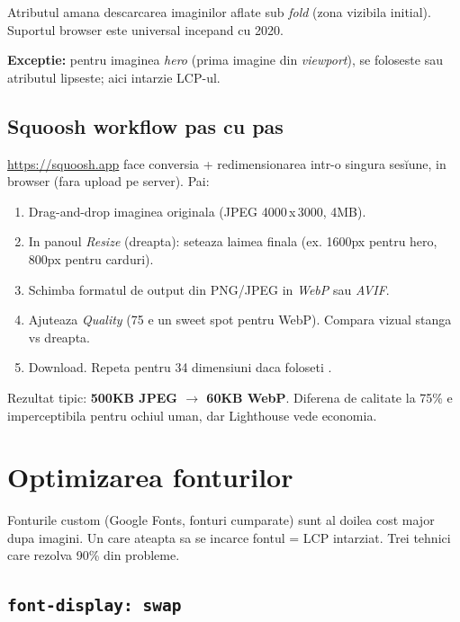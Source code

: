 Atributul  amana descarcarea imaginilor aflate sub \emph{fold} (zona vizibila initial). Suportul browser este universal incepand cu 2020.

\textbf{Exceptie:} pentru imaginea \emph{hero} (prima imagine din \emph{viewport}), se foloseste  sau atributul lipseste;  aici intarzie LCP-ul.

\subsection{Squoosh workflow pas cu pas}

\url{https://squoosh.app} face conversia + redimensionarea intr-o singura ses\u iune, in browser (fara upload pe server). Pai:

\begin{enumerate}[itemsep=1pt]
  \item Drag-and-drop imaginea originala (JPEG 4000\,x\,3000, 4MB).
  \item In panoul \emph{Resize} (dreapta): seteaza laimea finala (ex. 1600px pentru hero, 800px pentru carduri).
  \item Schimba formatul de output din PNG/JPEG in \emph{WebP} sau \emph{AVIF}.
  \item Ajuteaza \emph{Quality} (75 e un sweet spot pentru WebP). Compara vizual stanga vs dreapta.
  \item Download. Repeta pentru 3\textendash{}4 dimensiuni daca foloseti .
\end{enumerate}

Rezultat tipic: \textbf{500KB JPEG $\to$ 60KB WebP}. Diferena de calitate la 75\% e impercepti\-bila pentru ochiul uman, dar Lighthouse vede economia.

\section{Optimizarea fonturilor}

Fonturile custom (Google Fonts, fonturi cumparate) sunt al doilea cost major dupa imagini. Un  care ateapta sa se incarce fontul = LCP intarziat. Trei tehnici care rezolva 90\% din probleme.

\subsection{\texttt{font-display: swap}}

